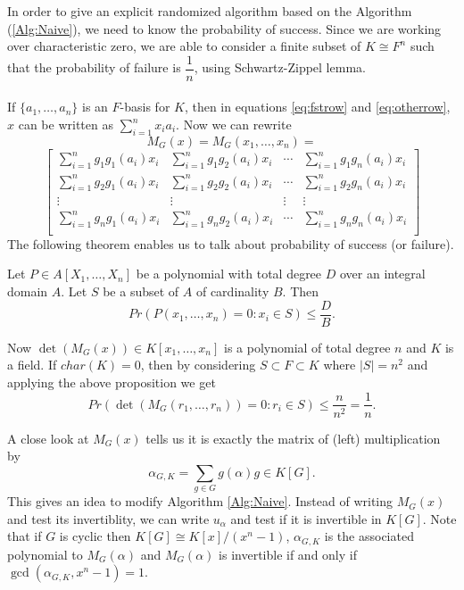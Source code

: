 \documentclass[sigconf]{acmart}
\newcommand{\osum}[2]{\alpha_{#1,#2}}
\theoremstyle{acmplain}
\begin{document}
 In order to give an explicit randomized algorithm based on the Algorithm (\ref{Alg:Naive}), we need to know 
 the probability of success. Since we are working over characteristic zero, we are able to consider a finite subset
 of $K \cong F^n$ such that the probability of failure is $\dfrac{1}{n}$, using 
 Schwartz-Zippel lemma.
 \\
 \\
 If $\lbrace a_1, \ldots , a_n \rbrace$ is an $F$-basis for $K$, then in equations
   \ref{eq:fstrow} and \ref{eq:otherrow}, $x$ can be written as $\sum_{i = 1}^nx_i
    a_i$. Now we can rewrite 
    $$
M_G(x) = M_G(x_1,\ldots,x_n) =  $$
$$
\begin{bmatrix}
\sum_{i = 1}^n g_1 g_1(a_i)x_i & \sum_{i = 1}^n g_1 g_2(a_i)x_i & \cdots & 
\sum_{i = 1}^n g_1 g_n(a_i)x_i \\
\sum_{i = 1}^n g_2 g_1(a_i)x_i & \sum_{i = 1}^n g_2 g_2(a_i)x_i & \cdots & 
\sum_{i = 1}^n g_2 g_n(a_i)x_i \\
\vdots		& \vdots	& \vdots & \vdots \\
\sum_{i = 1}^n g_n g_1(a_i)x_i & \sum_{i = 1}^n g_n g_2(a_i)x_i & \cdots & 
\sum_{i = 1}^n g_n g_n(a_i)x_i \\
\end{bmatrix}    
    $$ 
 The following theorem enables us to talk about probability of success (or failure).
 \begin{theorem}\cite[Proposition 98]{Zippel} \label{Thm:Zippel}
Let $P \in A[X_1, \ldots, X_n]$ be a polynomial with total degree $D$ over an integral domain $A$. Let $S$ be a subset of $A$ of cardinality $B$. Then $$Pr(P(x_1, \ldots , x_n)=0:x_i \in S) \leq \dfrac{D}{B}.$$
\end{theorem}

Now $\det(M_G(x)) \in K[x_1, \ldots , x_n]$ is a polynomial of total degree $n$ and $K$ is a field. If $char(K) =0$, then by considering $S \subset F \subset K$ where $|S| = n^2$ and applying the above proposition we get $$Pr(\det(M_G(r_1,\ldots , r_n)) = 0 : r_i \in S)\leq \dfrac{n}{n^2}= \dfrac{1}{n}.$$

 
 A close look at $M_G(x)$ tells us it is exactly the matrix of (left) multiplication by $$\alpha_{G,K} = \sum_{g \in G} g(\alpha)g \in K[G].$$  This gives an idea to modify Algorithm \ref{Alg:Naive}. Instead of writing $M_G(x)$ and test its invertiblity, 
 we can write $u_\alpha$ and test if it is invertible in $K[G]$. Note that if $G$ is cyclic then $K[G] \cong K[x]/(x^n-1)$,
 $\osum{G}{K}$ is the associated polynomial to $M_G(\alpha)$ and $M_G(\alpha)$ is invertible if and only if 
 $\gcd (\osum{G}{K},x^n-1) = 1 $.
\end{document}
